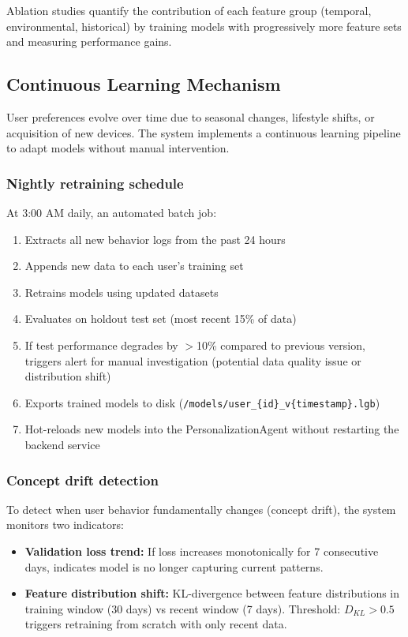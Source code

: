 Ablation studies quantify the contribution of each feature group (temporal, environmental, historical) by training models with progressively more feature sets and measuring performance gains.

\subsection{Continuous Learning Mechanism}
\label{sec:continuous-learning}

User preferences evolve over time due to seasonal changes, lifestyle shifts, or acquisition of new devices. The system implements a continuous learning pipeline to adapt models without manual intervention.

\subsubsection{Nightly retraining schedule}

At 3:00 AM daily, an automated batch job:

\begin{enumerate}
    \item Extracts all new behavior logs from the past 24 hours
    \item Appends new data to each user's training set
    \item Retrains models using updated datasets
    \item Evaluates on holdout test set (most recent 15\% of data)
    \item If test performance degrades by $>$10\% compared to previous version, triggers alert for manual investigation (potential data quality issue or distribution shift)
    \item Exports trained models to disk (\texttt{/models/user\_\{id\}\_v\{timestamp\}.lgb})
    \item Hot-reloads new models into the PersonalizationAgent without restarting the backend service
\end{enumerate}

\subsubsection{Concept drift detection}

To detect when user behavior fundamentally changes (concept drift), the system monitors two indicators:

\begin{itemize}
    \item \textbf{Validation loss trend:} If loss increases monotonically for 7 consecutive days, indicates model is no longer capturing current patterns.
    
    \item \textbf{Feature distribution shift:} KL-divergence between feature distributions in training window (30 days) vs recent window (7 days). Threshold: $D_{KL} > 0.5$ triggers retraining from scratch with only recent data.
\end{itemize}

